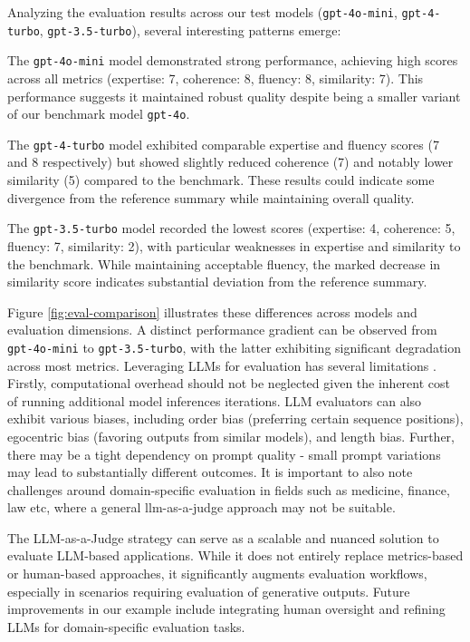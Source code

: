 Analyzing the evaluation results across our test models (\texttt{gpt-4o-mini}, \texttt{gpt-4-turbo}, \texttt{gpt-3.5-turbo}), several interesting patterns emerge:

The \texttt{gpt-4o-mini} model demonstrated strong performance, achieving high scores across all metrics (expertise: 7, coherence: 8, fluency: 8, similarity: 7). This performance suggests it maintained robust quality despite being a smaller variant of our benchmark model \texttt{gpt-4o}.

The \texttt{gpt-4-turbo} model exhibited comparable expertise and fluency scores (7 and 8 respectively) but showed slightly reduced coherence (7) and notably lower similarity (5) compared to the benchmark. These results could indicate some divergence from the reference summary while maintaining overall quality.

The \texttt{gpt-3.5-turbo} model recorded the lowest scores (expertise: 4, coherence: 5, fluency: 7, similarity: 2), with particular weaknesses in expertise and similarity to the benchmark. While maintaining acceptable fluency, the marked decrease in similarity score indicates substantial deviation from the reference summary.

Figure \ref{fig:eval-comparison} illustrates these differences across models and evaluation dimensions. A distinct performance gradient can be observed from \texttt{gpt-4o-mini} to \texttt{gpt-3.5-turbo}, with the latter exhibiting significant degradation across most metrics.
Leveraging LLMs for evaluation has several limitations . Firstly, computational overhead should not be neglected given the inherent cost of running additional model inferences iterations. LLM evaluators can also exhibit various biases, including order bias (preferring certain sequence positions), egocentric bias (favoring outputs from similar models), and length bias. Further, there may be a tight dependency on prompt quality - small prompt variations may lead to substantially different outcomes. It is important to also note challenges around domain-specific evaluation in fields such as medicine, finance, law etc, where a general llm-as-a-judge approach may not be suitable.

The LLM-as-a-Judge strategy can serve as a scalable and nuanced solution to evaluate LLM-based applications. While it does not entirely replace metrics-based or human-based approaches, it significantly augments evaluation workflows, especially in scenarios requiring evaluation of generative outputs. Future improvements in our example include integrating human oversight and refining LLMs for domain-specific evaluation tasks.

